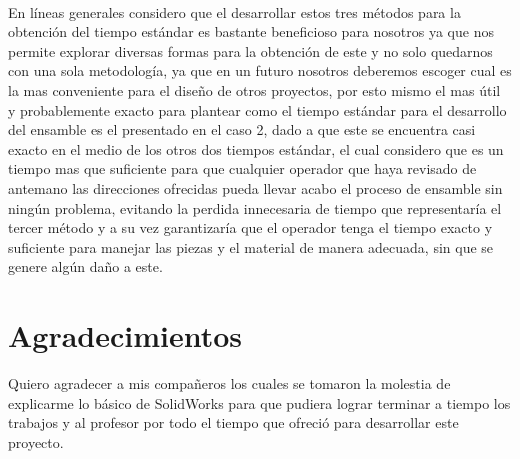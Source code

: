 \\En líneas generales considero que el desarrollar estos tres métodos para la obtención del tiempo estándar es bastante beneficioso para nosotros ya que nos permite explorar diversas formas para la obtención de este y no solo quedarnos con una sola metodología, ya que en un futuro nosotros deberemos escoger cual es la mas conveniente para el diseño de otros proyectos, por esto mismo el mas útil y probablemente exacto para plantear como el tiempo estándar para el desarrollo del ensamble es el presentado en el caso 2, dado a que este se encuentra casi exacto en el medio de los otros dos tiempos estándar, el cual considero que es un tiempo mas que suficiente para que cualquier operador que haya revisado de antemano las direcciones ofrecidas pueda llevar acabo el proceso de ensamble sin ningún problema, evitando la perdida innecesaria de tiempo que representaría el tercer método y a su vez garantizaría que el operador tenga el tiempo exacto y suficiente para manejar las piezas y el material de manera adecuada, sin que se genere algún daño a este.


    \section{Agradecimientos}
    
    Quiero agradecer a mis compañeros los cuales se tomaron la molestia de explicarme lo básico de SolidWorks para que pudiera lograr terminar a tiempo los trabajos y al profesor por todo el tiempo que ofreció para desarrollar este proyecto.
    
    
